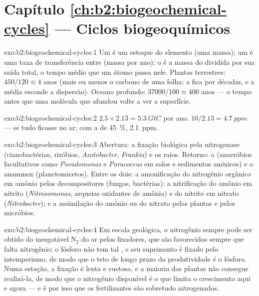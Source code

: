\section*{Capítulo \ref{ch:b2:biogeochemical-cycles} --- Ciclos biogeoquímicos}

\begin{solution}{exo:b2:biogeochemical-cycles:1}
Um  é um estoque do elemento (uma massa); um  é uma
taxa de transferência entre  (massa por ano); o  é a massa do  dividida por sua saída total, o
tempo médio que um átomo passa nele. Plantas terrestres: $450/120 \approx 4$ anos (mais ou
menos o carbono de uma folha; a  fica por décadas, e a média
esconde a dispersão). Oceano profundo: $37000/100 \approx 400$ anos ---
o tempo antes que uma molécula que afundou volte a ver a superfície.
\end{solution}

\begin{solution}{exo:b2:biogeochemical-cycles:2}
$2.5\times 2.13 = \qty{5.3}{GtC}$ por ano. $10/2.13 = \qty{4.7}{ppm}$
--- se tudo ficasse no ar; com a  de \qty{45}{\%},
\qty{2.1}{ppm}.
\end{solution}

\begin{solution}{exo:b2:biogeochemical-cycles:3}
Abertura: a fixação biológica pela nitrogenase (cianobactérias,
rizóbios, \emph{Azotobacter}, \emph{Frankia}) e os raios. Retorno:
a  (anaeróbios facultativos como \emph{Pseudomonas}
e \emph{Paracoccus} em solos e sedimentos anóxicos) e o anammox
(planctomicetos). Entre os dois: a amonificação do nitrogênio orgânico
em amônio pelos decompositores (fungos, bactérias); a nitrificação do
amônio em nitrito (\emph{Nitrosomonas}, arqueias oxidantes de amônia)
e do nitrito em nitrato (\emph{Nitrobacter}); e a
assimilação do amônio ou do nitrato pelas plantas e pelos micróbios.
\end{solution}

\begin{solution}{exo:b2:biogeochemical-cycles:4}
Em escala geológica, o nitrogênio sempre pode ser obtido do inesgotável
$\mathrm{N_2}$ do ar pelos fixadores, que são favorecidos sempre que
falta nitrogênio; o fósforo não tem tal , e seu suprimento é
fixado pelo intemperismo, de modo que o teto de longo prazo da
produtividade é o fósforo. Numa estação, a fixação é lenta e custosa, e
a maioria das plantas não consegue realizá-la, de modo que o nitrogênio
disponível é o que limita o crescimento aqui e agora --- e é por isso
que os fertilizantes são sobretudo nitrogenados.
\end{solution}

